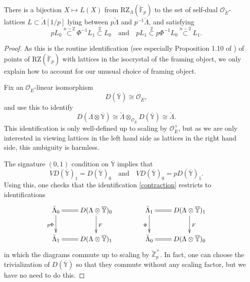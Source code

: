 \documentclass[11pt]{alggeom}
\newcommand{\iso}{\cong}
\newcommand{\Z}{\mathbb Z}
\newcommand{\F}{\mathbb F}
\newcommand{\co}{\mathcal O}
\begin{document}
\begin{proposition}\label{prop:hyperspecial points}
There is a bijection $X \mapsto L(X)$  from $\mathrm{RZ}_\Lambda(\breve{\F}_p)$ to the set of  self-dual $\co_{\breve{E}}$-lattices $L \subset \breve{\Lambda} [1/p]$  lying between $p\breve{\Lambda}$ and $p^{-1}\breve{\Lambda}$, and satisfying
\[
 pL_0  \stackrel{n-2}{\subset} \Phi^{-1} L_1 \stackrel{2}{\subset} L_0
\quad  \mbox{and}\quad
p L_1  \stackrel{2}{\subset} p \Phi^{-1} L_0  \stackrel{n-2}{\subset}   L_1.
\]
\end{proposition}

\begin{proof}
As this is the routine identification (see especially  Proposition 1.10 of \cite{Vollaard}) of points of $\mathrm{RZ}(\breve{\F}_p)$ with lattices in the isocrystal of the framing object, 
we only  explain how to account for our unusual choice of framing object.





Fix an $\co_{\breve{E}}$-linear isomorphism
\[
D(\overline{\mathbb{Y}}) \iso \co_{\breve{E}},
\]
and use this to identify
\begin{equation}\label{contraction}
D(\Lambda \otimes \overline{\mathbb{Y}})
\iso 
\breve{\Lambda} \otimes_{\co_{\breve{E}}} D(\overline{\mathbb{Y}}) 
\iso \breve{\Lambda}.
\end{equation}
This identification is only well-defined up to scaling by $\co_{\breve{E}}^\times$, but as we are only interested in viewing lattices in the left hand side as lattices in the right hand side, this ambiguity is harmless.


The signature $(0,1)$ condition on $\overline{\mathbb{Y}}$ implies that 
\[
V D( \overline{\mathbb{Y}})_1 = D( \overline{\mathbb{Y}})_0 
\quad\mbox{and}\quad
V D( \overline{\mathbb{Y}})_0 = pD( \overline{\mathbb{Y}})_1 .
\]
Using this, one checks that the identification  \eqref{contraction} restricts to identifications
\begin{equation}\label{contraction diagrams}
\xymatrix{
{  \breve{\Lambda}_0 } \ar[d]_{  p \Phi   }   \ar@{=}[r]   &  { D(\Lambda \otimes \overline{\mathbb{Y}})_0     } \ar[d]^{  F  }    \\
{   \breve{\Lambda}_1 } \ar@{=}[r]     &  { D(\Lambda \otimes \overline{\mathbb{Y}})_1    } 
}
\qquad \qquad
\xymatrix{
{    \breve{\Lambda}_1} \ar[d]_{ \Phi   }   \ar@{=}[r]   &  { D(\Lambda \otimes \overline{\mathbb{Y}})_1    } \ar[d]^{  F  }    \\
{  \breve{\Lambda}_0  } \ar@{=}[r]     &  { D(\Lambda \otimes \overline{\mathbb{Y}})_0   } 
} 
\end{equation}
in which the diagrams  commute up to scaling by $\breve{\Z}_p^\times$.   In fact, one can choose the trivialization of $D(\overline{\mathbb{Y}})$ so that they commute without any scaling factor, but we have no need to do this.





\end{proof}
\end{document}
